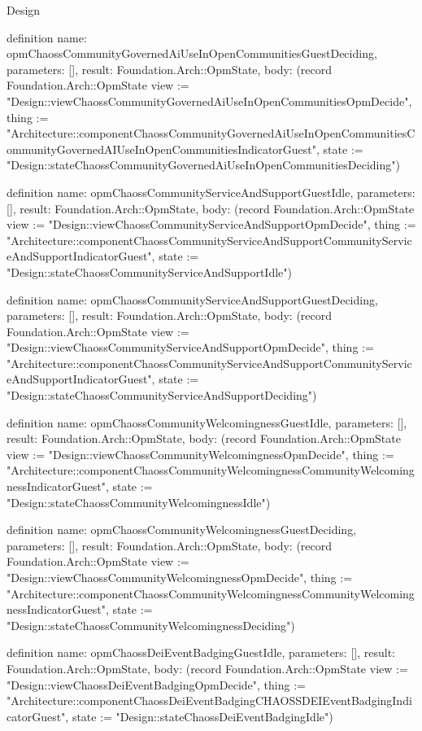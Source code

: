 \begin{lexlean}{Design}
\begin{semanticmodule}
definition{
  name: opmChaossCommunityGovernedAiUseInOpenCommunitiesGuestDeciding,
  parameters: [],
  result: Foundation.Arch::OpmState,
  body: (record Foundation.Arch::OpmState {view := "Design::viewChaossCommunityGovernedAiUseInOpenCommunitiesOpmDecide", thing := "Architecture::componentChaossCommunityGovernedAiUseInOpenCommunitiesCommunityGovernedAIUseInOpenCommunitiesIndicatorGuest", state := "Design::stateChaossCommunityGovernedAiUseInOpenCommunitiesDeciding"})
}

definition{
  name: opmChaossCommunityServiceAndSupportGuestIdle,
  parameters: [],
  result: Foundation.Arch::OpmState,
  body: (record Foundation.Arch::OpmState {view := "Design::viewChaossCommunityServiceAndSupportOpmDecide", thing := "Architecture::componentChaossCommunityServiceAndSupportCommunityServiceAndSupportIndicatorGuest", state := "Design::stateChaossCommunityServiceAndSupportIdle"})
}

definition{
  name: opmChaossCommunityServiceAndSupportGuestDeciding,
  parameters: [],
  result: Foundation.Arch::OpmState,
  body: (record Foundation.Arch::OpmState {view := "Design::viewChaossCommunityServiceAndSupportOpmDecide", thing := "Architecture::componentChaossCommunityServiceAndSupportCommunityServiceAndSupportIndicatorGuest", state := "Design::stateChaossCommunityServiceAndSupportDeciding"})
}

definition{
  name: opmChaossCommunityWelcomingnessGuestIdle,
  parameters: [],
  result: Foundation.Arch::OpmState,
  body: (record Foundation.Arch::OpmState {view := "Design::viewChaossCommunityWelcomingnessOpmDecide", thing := "Architecture::componentChaossCommunityWelcomingnessCommunityWelcomingnessIndicatorGuest", state := "Design::stateChaossCommunityWelcomingnessIdle"})
}

definition{
  name: opmChaossCommunityWelcomingnessGuestDeciding,
  parameters: [],
  result: Foundation.Arch::OpmState,
  body: (record Foundation.Arch::OpmState {view := "Design::viewChaossCommunityWelcomingnessOpmDecide", thing := "Architecture::componentChaossCommunityWelcomingnessCommunityWelcomingnessIndicatorGuest", state := "Design::stateChaossCommunityWelcomingnessDeciding"})
}

definition{
  name: opmChaossDeiEventBadgingGuestIdle,
  parameters: [],
  result: Foundation.Arch::OpmState,
  body: (record Foundation.Arch::OpmState {view := "Design::viewChaossDeiEventBadgingOpmDecide", thing := "Architecture::componentChaossDeiEventBadgingCHAOSSDEIEventBadgingIndicatorGuest", state := "Design::stateChaossDeiEventBadgingIdle"})
}


\end{semanticmodule}
\end{lexlean}

